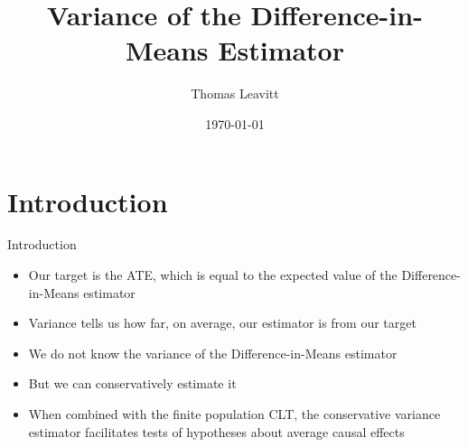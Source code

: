 \documentclass[table, xcolor={dvipsnames}, 9pt]{beamer}
\title[]{Variance of the Difference-in-Means Estimator} %
\author{Thomas Leavitt} %
\institute[] %
{
\medskip
\textit{} %
}
\date{\today} %
\theoremstyle{newstyle}
\begin{document}
\begin{frame}
\titlepage %
\end{frame}


\section{Introduction}
\begin{frame}{Introduction}
\begin{itemize}
\item Our target is the ATE, which is equal to the expected value of the Difference-in-Means estimator \pause 
\item Variance tells us how far, on average, our estimator is from our target \pause 
\item We do not know the variance of the Difference-in-Means estimator \pause 
\item But we can conservatively estimate it \pause 
\item When combined with the finite population CLT, the conservative variance estimator facilitates tests of hypotheses about average causal effects
\end{itemize}
\end{frame}
\end{document}
